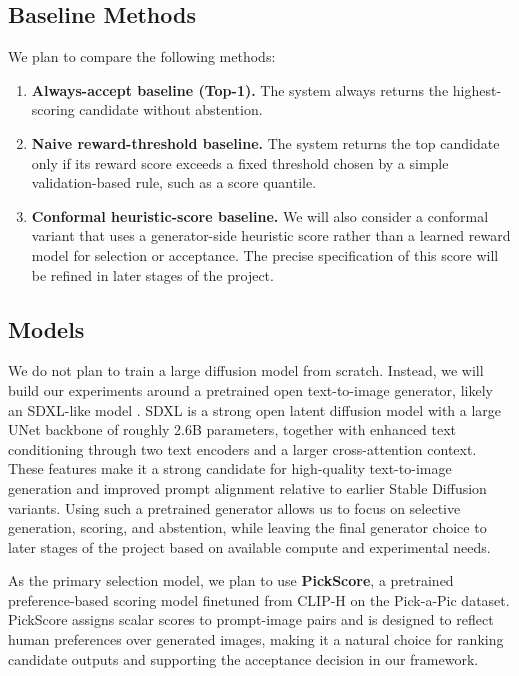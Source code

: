 \documentclass[twocolumn,11pt]{article}
\theoremstyle{plain}
\theoremstyle{definition}
\theoremstyle{remark}
\begin{document}
\subsection{Baseline Methods}
We plan to compare the following methods:
\begin{enumerate}[leftmargin=1.5em]
    \item \textbf{Always-accept baseline (Top-1).} The system always returns the highest-scoring candidate without abstention.
    \item \textbf{Naive reward-threshold baseline.} The system returns the top candidate only if its reward score exceeds a fixed threshold chosen by a simple validation-based rule, such as a score quantile.
    \item \textbf{Conformal heuristic-score baseline.} We will also consider a conformal variant that uses a generator-side heuristic score rather than a learned reward model for selection or acceptance. The precise specification of this score will be refined in later stages of the project.
\end{enumerate}


\subsection{Models}

We do not plan to train a large diffusion model from scratch. Instead, we will build our experiments around a pretrained open text-to-image generator, likely an SDXL-like model \citep{podell2023sdxl}. SDXL is a strong open latent diffusion model with a large UNet backbone of roughly 2.6B parameters, together with enhanced text conditioning through two text encoders and a larger cross-attention context. These features make it a strong candidate for high-quality text-to-image generation and improved prompt alignment relative to earlier Stable Diffusion variants. Using such a pretrained generator allows us to focus on selective generation, scoring, and abstention, while leaving the final generator choice to later stages of the project based on available compute and experimental needs.

As the primary selection model, we plan to use \textbf{PickScore}, a pretrained preference-based scoring model finetuned from CLIP-H on the Pick-a-Pic dataset. PickScore assigns scalar scores to prompt-image pairs and is designed to reflect human preferences over generated images, making it a natural choice for ranking candidate outputs and supporting the acceptance decision in our framework.
\end{document}
